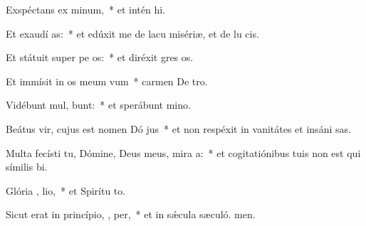 \item Exspéctans ex minum,~* et intén hi.
\item Et exaudí  as:~* et edúxit me de lacu misériæ, et de lu cis.
\item Et státuit super pe  os:~* et diréxit gres os.
\item Et immísit in os meum  vum~* carmen De tro.
\item Vidébunt mul,  bunt:~* et sperábunt  mino.
\item Beátus vir, cujus est nomen Dó  jus~* et non respéxit in vanitátes et insáni sas.
\item Multa fecísti tu, Dómine, Deus meus, mira a:~* et cogitatiónibus tuis non est qui símilis  bi.
\item Glória ,  lio,~* et Spirítu to.
\item Sicut erat in princípio,  ,  per,~* et in sǽcula sæculó. men.
